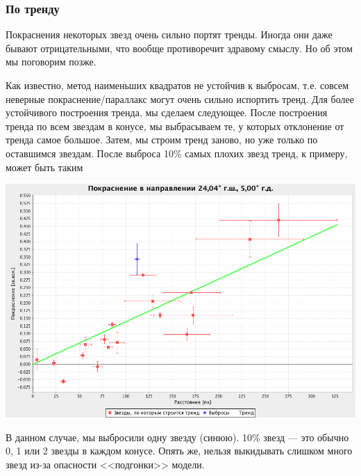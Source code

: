 \documentclass[14pt]{article}
\begin{document}
            \subsubsection{По тренду}
                Покраснения некоторых звезд очень сильно портят тренды. Иногда они даже бывают отрицательными, что вообще противоречит здравому смыслу. Но об этом мы поговорим позже.
                
                Как известно, метод наименьших квадратов не устойчив к выбросам, т.е. совсем неверные покраснение/параллакс могут очень сильно испортить тренд. Для более устойчивого построения тренда, мы сделаем следующее. После построения тренда по всем звездам в конусе, мы выбрасываем те, у которых отклонение от тренда самое большое. Затем, мы строим тренд заново, но уже только по оставшимся звездам. После выброса 10\% самых плохих звезд тренд, к примеру, может быть таким
                \begin{center}
                    \includegraphics[scale=0.3]{../../presentation/real-2-k.png}
                \end{center}	
                
                В данном случае, мы выбросили одну звезду (синюю). 10\% звезд --- это обычно 0, 1 или 2 звезды в каждом конусе. Опять же, нельзя выкидывать слишком много звезд из-за опасности <<подгонки>> модели. 
\end{document}

